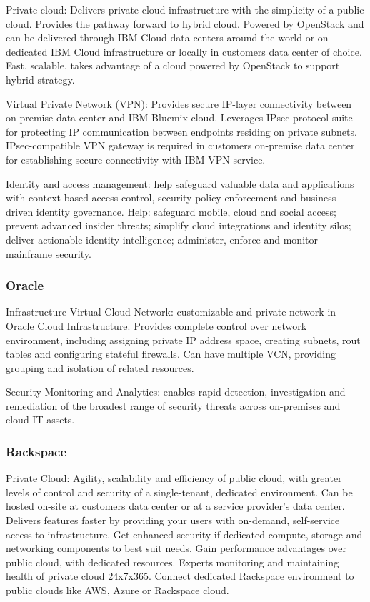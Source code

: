 Private cloud: Delivers private cloud infrastructure with the simplicity of a public cloud. Provides the pathway forward to hybrid cloud. Powered by OpenStack and can be delivered through IBM Cloud data centers around the world or on dedicated IBM Cloud infrastructure or locally in customers data center of choice. Fast, scalable, takes advantage of a cloud powered by OpenStack to support hybrid strategy. 

Virtual Private Network (VPN): Provides secure IP-layer connectivity between on-premise data center and IBM Bluemix cloud. Leverages IPsec protocol suite for protecting IP communication between endpoints residing on private subnets. IPsec-compatible VPN gateway is required in customers on-premise data center for establishing secure connectivity with IBM VPN service. 

Identity and access management: help safeguard valuable data and applications with context-based access control, security policy enforcement and business-driven identity governance. Help: safeguard mobile, cloud and social access; prevent advanced insider threats; simplify cloud integrations and identity silos; deliver actionable identity intelligence; administer, enforce and monitor mainframe security. 

\subsubsection{Oracle}
Infrastructure Virtual Cloud Network: customizable and private network in Oracle Cloud Infrastructure. Provides complete control over network environment, including assigning private IP address space, creating subnets, rout tables and configuring stateful firewalls. Can have multiple VCN, providing grouping and isolation of related resources. 

Security Monitoring and Analytics: enables rapid detection, investigation and remediation of the broadest range of security threats across on-premises and cloud IT assets. 

\subsubsection{Rackspace}
Private Cloud: Agility, scalability and efficiency of public cloud, with greater levels of control and security of a single-tenant, dedicated environment. Can be hosted on-site at customers data center or at a service provider's data center. Delivers features faster by providing your users with on-demand, self-service access to infrastructure. Get enhanced security if dedicated compute, storage and networking components to best suit needs. Gain performance advantages over public cloud, with dedicated resources. Experts monitoring and maintaining health of private cloud 24x7x365. Connect dedicated Rackspace environment to public clouds like AWS, Azure or Rackspace cloud. 

